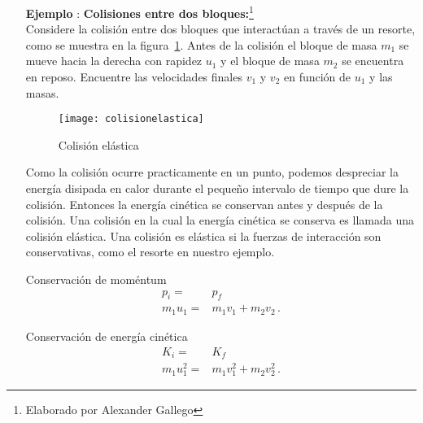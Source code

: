 \begin{itemize}
\item[\textbf{Ejemplo}]: \textbf{Colisiones entre dos bloques:}\footnote{Elaborado por Alexander Gallego}\\
Considere la colisión entre dos bloques que interactúan a través de un resorte, como se muestra en la figura~\ref{fig:colisionelastica}. Antes de la colisión el bloque de masa $m_1$ se mueve hacia la derecha con rapidez $u_1$ y el bloque de masa $m_2$ se encuentra en reposo. Encuentre las velocidades finales $v_1$ y $v_2$ en función de $u_1$ y las masas. 

\begin{figure}
  \centering
  \texttt{[image: colisionelastica]}
  \caption{Colisión elástica}
  \label{fig:colisionelastica}
\end{figure}

Como la colisión ocurre practicamente en un punto, podemos despreciar la energía disipada en calor durante el pequeño intervalo de tiempo que dure la colisión. Entonces la energía cinética se conservan antes y después de la colisión. Una colisión en la cual la energía cinética se conserva es llamada una colisión elástica. Una colisión es elástica si la fuerzas de interacción son conservativas, como el resorte en nuestro ejemplo.

Conservaci\'on de moméntum
\begin{align}
  \label{eq:e1}
  p_{i}=&p_f\nonumber\\
  m_1 u_1 =& m_1 v_1 + m_2 v_2\,.
\end{align}

Conservaci\'on de energía cinética
\begin{align}
  \label{eq:e2}
  K_i=&K_f\nonumber\\
  m_1 u^2_1 =& m_1 v^2_1 + m_2 v^2_2\,.
\end{align}


\end{itemize}
